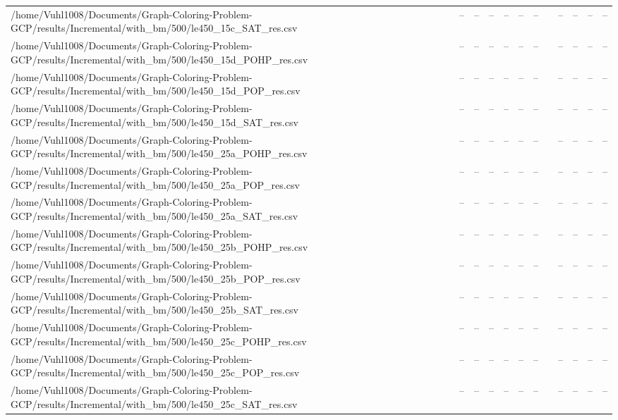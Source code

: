 \begin{table}[htbp]
\begin{tabular}{llllllllllll}
/home/Vuhl1008/Documents/Graph-Coloring-Problem-GCP/results/Incremental/with\_bm/500/le450\_15c\_SAT\_res.csv & -- & -- & -- & -- & -- & -- & {} & -- & -- & -- & -- \\
/home/Vuhl1008/Documents/Graph-Coloring-Problem-GCP/results/Incremental/with\_bm/500/le450\_15d\_POHP\_res.csv & -- & -- & -- & -- & -- & -- & {} & -- & -- & -- & -- \\
/home/Vuhl1008/Documents/Graph-Coloring-Problem-GCP/results/Incremental/with\_bm/500/le450\_15d\_POP\_res.csv & -- & -- & -- & -- & -- & -- & {} & -- & -- & -- & -- \\
/home/Vuhl1008/Documents/Graph-Coloring-Problem-GCP/results/Incremental/with\_bm/500/le450\_15d\_SAT\_res.csv & -- & -- & -- & -- & -- & -- & {} & -- & -- & -- & -- \\
/home/Vuhl1008/Documents/Graph-Coloring-Problem-GCP/results/Incremental/with\_bm/500/le450\_25a\_POHP\_res.csv & -- & -- & -- & -- & -- & -- & {} & -- & -- & -- & -- \\
/home/Vuhl1008/Documents/Graph-Coloring-Problem-GCP/results/Incremental/with\_bm/500/le450\_25a\_POP\_res.csv & -- & -- & -- & -- & -- & -- & {} & -- & -- & -- & -- \\
/home/Vuhl1008/Documents/Graph-Coloring-Problem-GCP/results/Incremental/with\_bm/500/le450\_25a\_SAT\_res.csv & -- & -- & -- & -- & -- & -- & {} & -- & -- & -- & -- \\
/home/Vuhl1008/Documents/Graph-Coloring-Problem-GCP/results/Incremental/with\_bm/500/le450\_25b\_POHP\_res.csv & -- & -- & -- & -- & -- & -- & {} & -- & -- & -- & -- \\
/home/Vuhl1008/Documents/Graph-Coloring-Problem-GCP/results/Incremental/with\_bm/500/le450\_25b\_POP\_res.csv & -- & -- & -- & -- & -- & -- & {} & -- & -- & -- & -- \\
/home/Vuhl1008/Documents/Graph-Coloring-Problem-GCP/results/Incremental/with\_bm/500/le450\_25b\_SAT\_res.csv & -- & -- & -- & -- & -- & -- & {} & -- & -- & -- & -- \\
/home/Vuhl1008/Documents/Graph-Coloring-Problem-GCP/results/Incremental/with\_bm/500/le450\_25c\_POHP\_res.csv & -- & -- & -- & -- & -- & -- & {} & -- & -- & -- & -- \\
/home/Vuhl1008/Documents/Graph-Coloring-Problem-GCP/results/Incremental/with\_bm/500/le450\_25c\_POP\_res.csv & -- & -- & -- & -- & -- & -- & {} & -- & -- & -- & -- \\
/home/Vuhl1008/Documents/Graph-Coloring-Problem-GCP/results/Incremental/with\_bm/500/le450\_25c\_SAT\_res.csv & -- & -- & -- & -- & -- & -- & {} & -- & -- & -- & -- \\

\end{tabular}
\end{table}
